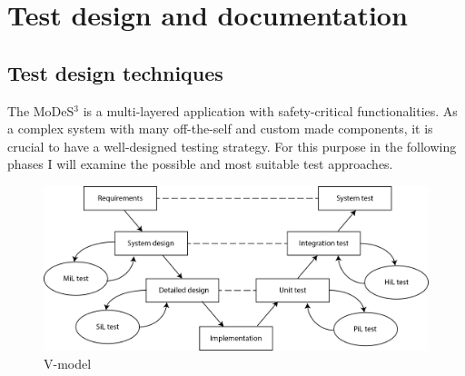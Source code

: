 \chapter{Test design and documentation}
\section{Test design techniques}


The MoDeS$^3$ is a multi-layered application with safety-critical functionalities. As a complex system with many off-the-self and custom made components, it is crucial to have a well-designed testing strategy. For this purpose in the following phases I will examine the possible and most suitable test approaches.

\begin{figure}[h]
	\centering
	\includegraphics[width=150mm]{figures/testDesign/V_model.png}
	\caption{V-model}
	\label{fig:vModel}
\end{figure}

